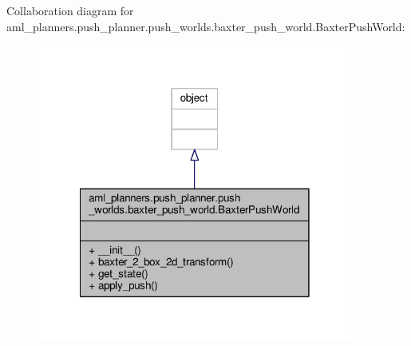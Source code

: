 Collaboration diagram for aml\-\_\-planners.\-push\-\_\-planner.\-push\-\_\-worlds.\-baxter\-\_\-push\-\_\-world.\-Baxter\-Push\-World\-:
\nopagebreak
\begin{figure}[H]
\begin{center}
\leavevmode
\includegraphics[width=294pt]{classaml__planners_1_1push__planner_1_1push__worlds_1_1baxter__push__world_1_1_baxter_push_world__coll__graph}
\end{center}
\end{figure}
